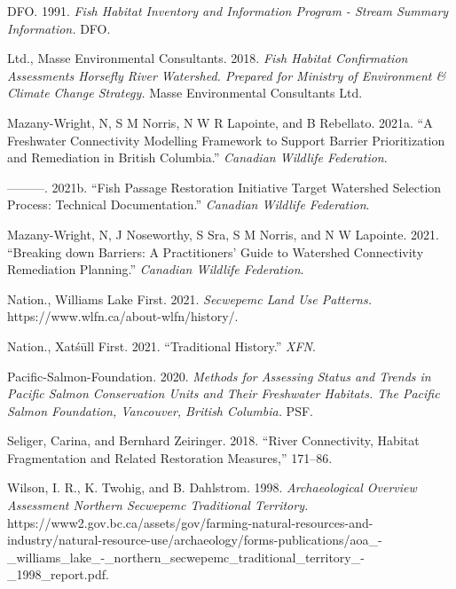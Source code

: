 \documentclass[
  letterpaper,
  DIV=11,
  numbers=noendperiod]{scrreprt}
\newlength{\cslhangindent}
\newlength{\cslentryspacingunit} %
\newenvironment{CSLReferences}[2] %
 {%
  \setlength{\parindent}{0pt}
  \ifodd #1
  \let\oldpar\par
  \def\par{\hangindent=\cslhangindent\oldpar}
  \fi
  \setlength{\parskip}{#2\cslentryspacingunit}
 }%
 {}
\begin{document}
\hypertarget{refs}{}
\begin{CSLReferences}{1}{0}
\leavevmode{}%
DFO. 1991. \emph{Fish Habitat Inventory and Information Program - Stream
Summary Information.} DFO.

\leavevmode{}%
Ltd., Masse Environmental Consultants. 2018. \emph{Fish Habitat
Confirmation Assessments Horsefly River Watershed. Prepared for Ministry
of Environment \& Climate Change Strategy.} Masse Environmental
Consultants Ltd.

\leavevmode{}%
Mazany-Wright, N, S M Norris, N W R Lapointe, and B Rebellato. 2021a.
{``A Freshwater Connectivity Modelling Framework to Support Barrier
Prioritization and Remediation in British Columbia.''} \emph{Canadian
Wildlife Federation}.

\leavevmode{}%
---------. 2021b. {``Fish Passage Restoration Initiative Target
Watershed Selection Process: Technical Documentation.''} \emph{Canadian
Wildlife Federation}.

\leavevmode{}%
Mazany-Wright, N, J Noseworthy, S Sra, S M Norris, and N W Lapointe.
2021. {``Breaking down Barriers: A Practitioners' Guide to Watershed
Connectivity Remediation Planning.''} \emph{Canadian Wildlife
Federation}.

\leavevmode{}%
Nation., Williams Lake First. 2021. \emph{Secwepemc Land Use Patterns.}
https://www.wlfn.ca/about-wlfn/history/.

\leavevmode{}%
Nation., Xatśūll First. 2021. {``Traditional History.''} \emph{XFN}.

\leavevmode{}%
Pacific-Salmon-Foundation. 2020. \emph{Methods for Assessing Status and
Trends in Pacific Salmon Conservation Units and Their Freshwater
Habitats. The Pacific Salmon Foundation, Vancouver, British Columbia.}
PSF.

\leavevmode{}%
Seliger, Carina, and Bernhard Zeiringer. 2018. {``River Connectivity,
Habitat Fragmentation and Related Restoration Measures,''} 171--86.

\leavevmode{}%
Wilson, I. R., K. Twohig, and B. Dahlstrom. 1998. \emph{Archaeological
Overview Assessment Northern Secwepemc Traditional Territory.}
https://www2.gov.bc.ca/assets/gov/farming-natural-resources-and-industry/natural-resource-use/archaeology/forms-publications/aoa\_-\_williams\_lake\_-\_northern\_secwepemc\_traditional\_territory\_-\_1998\_report.pdf.

\end{CSLReferences}
\end{document}
